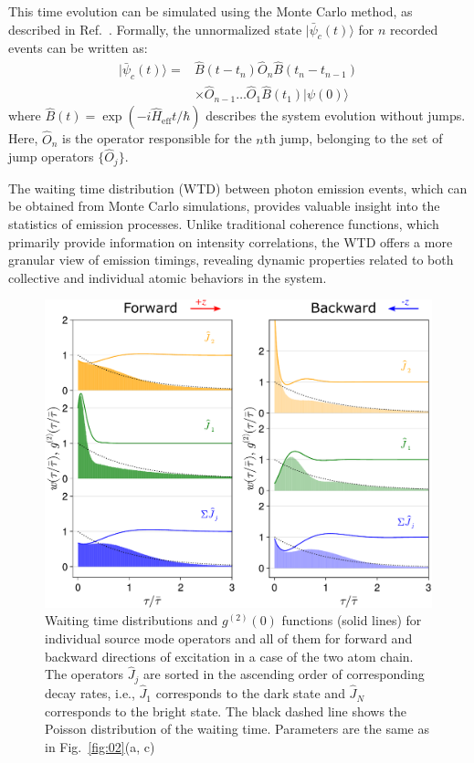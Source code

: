 \documentclass[aps,prl,twocolumn,superscriptaddress,showpacs,amsmath,amssymb]{revtex4-2}
\begin{document}
This time evolution can be simulated using the Monte Carlo method, as described in Ref.~\cite{carmichael2009statistical}. Formally, the unnormalized state $ | \bar{\psi}_c(t) \rangle $ for $ n $ recorded events can be written as:
\begin{align} 
    | \bar{\psi}_c(t) \rangle = & \hat{B}(t - t_n) \hat{O}_n \hat{B}(t_n - t_{n-1}) \nonumber \\ 
                                & \times \hat{O}_{n-1} \ldots \hat{O}_1 \hat{B}(t_1) |\psi(0) \rangle
    \label{eq:18}
\end{align}
where $ \hat{B}(t) = \exp(-i \hat{H}_\mathrm{eff} t / \hbar) $ describes the system evolution without jumps. Here, $ \hat{O}_n $ is the operator responsible for the $ n $th jump, belonging to the set of jump operators $ \{\hat{O}_j\} $.

The waiting time distribution (WTD) between photon emission events, which can be obtained from Monte Carlo simulations, provides valuable insight into the statistics of emission processes. Unlike traditional coherence functions, which primarily provide information on intensity correlations, the WTD offers a more granular view of emission timings, revealing dynamic properties related to both collective and individual atomic behaviors in the system.

\begin{figure}
    \begin{center}
        \includegraphics[width=0.95\columnwidth]{fig_3}
    \end{center}
\caption{Waiting time distributions and $g^{(2)}(0)$ functions (solid lines) for individual source mode operators and all of them for forward and backward directions of excitation in a case of the two atom chain. The operators $\hat{J}_j$ are sorted in the ascending order of corresponding decay rates, i.e., $\hat{J}_1$ corresponds to the dark state and $\hat{J}_N$ corresponds to the bright state. The black dashed line shows the Poisson distribution of the waiting time. Parameters are the same as in Fig.~\ref{fig:02}(a, c)}\label{fig:03}
\end{figure}
\end{document}
